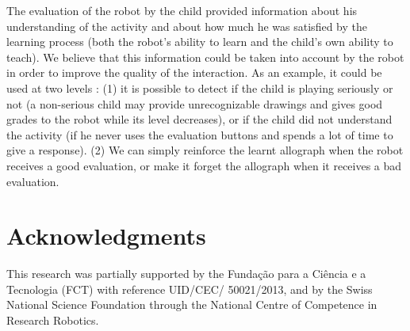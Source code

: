 \documentclass{sig-alternate}
\begin{document}
The evaluation of the robot by the child provided information about his
understanding of the activity and about how much he was satisfied by the
learning process (both the robot's ability to learn and the child's own
ability to teach). We believe that this information could be taken into account by
the robot in order to improve the quality of the interaction. As an example, it
could be used at two levels : (1) it is possible to detect if the child is playing
seriously or not (a non-serious child may provide unrecognizable drawings and gives good grades to
the robot while its level decreases), or if the child did not understand the
activity (if he never uses the evaluation buttons and spends a lot of time to
give a response). (2) We can simply reinforce the learnt allograph when the robot
receives a good evaluation, or make it forget the allograph when it
receives a bad evaluation.

\section*{Acknowledgments}

This research was partially supported by the Funda\c{c}\~{a}o para a Ci\^{e}ncia
e a Tecnologia (FCT) with reference UID/CEC/ 50021/2013, and by the Swiss
National Science Foundation through the National Centre of Competence in
Research Robotics.



 
\end{document}
